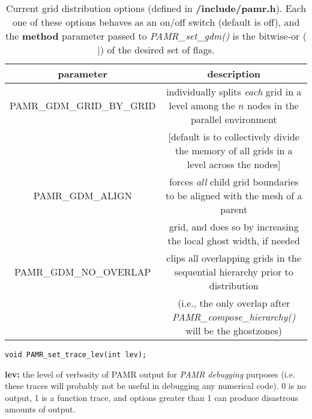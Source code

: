 \documentclass[aps,amssymb,unsortedaddress,nofootinbib]{revtex4}
\def\lsep{\itemsep 0.05in}
\begin{document}
\begin{table}
\begin{center}
\begin{tabular}[t]{| c || c |}
\hline
parameter & description \\
\hline
\hline
PAMR\_GDM\_GRID\_BY\_GRID  & individually splits {\em each} grid in a level among the $n$ nodes in 
                             the parallel environment \\ 
                           & [default is to collectively divide
                             the memory of all grids in a level across the nodes] \\
PAMR\_GDM\_ALIGN           & forces {\em all} child grid boundaries to be aligned with the mesh of a parent \\
                           & grid, and does so by increasing the local ghost width, if needed\\
PAMR\_GDM\_NO\_OVERLAP     & clips all overlapping grids in the sequential hierarchy prior to distribution \\
                           & (i.e., the only overlap after
                             {\em PAMR\_compose\_hierarchy()} will be the ghostzones)\\
\hline
\end{tabular}
\end{center}
\caption
{ Current grid distribution options (defined in {\bf /include/pamr.h}). Each one
of these options behaves as an on/off switch (default is off), and the {\bf method}
parameter passed to {\em PAMR\_set\_gdm()} is the bitwise-or ($|$) of the desired
set of flags.
\label{tab_gdm_ops}}
\end{table}


\begin{verbatim}
void PAMR_set_trace_lev(int lev);
\end{verbatim}
\begin{list}{}{\lsep}
\item {\bf lev:} the level of verbosity of PAMR output for {\em PAMR debugging} 
                 purposes (i.e. these traces will probably not be useful in debugging
                 any numerical code). 0 is no output, 1 is a function trace, and
                 options greater than 1 can produce disastrous amounts of output.
\end{list}

\end{document}
